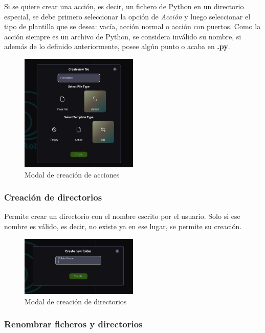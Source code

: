 Si se quiere crear una acción, es decir, un fichero de Python en un directorio especial, se debe primero seleccionar la opción de \textit{Acción} y luego seleccionar el tipo de plantilla que se desea: vacía, acción normal o acción con puertos. Como la acción siempre es un archivo de Python, se considera inválido su nombre, si además de lo definido anteriormente, posee algún punto o acaba en \textbf{.py}.

\begin{figure}[H]
    \centering
    \includegraphics[width=0.5\textwidth]{figures/bt-avances/new-action.png}
    \caption{Modal de creación de acciones}
    \label{fig:bt-action-new}
\end{figure}

\subsubsection{Creación de directorios}

Permite crear un directorio con el nombre escrito por el usuario. Solo si ese nombre es válido, es decir, no existe ya en ese lugar, se permite su creación.

\begin{figure}[H]
    \centering
    \includegraphics[width=0.5\textwidth]{figures/bt-avances/bt-folder-new.png}
    \caption{Modal de creación de directorios}
    \label{fig:bt-dir-new}
\end{figure}

\subsubsection{Renombrar ficheros y directorios}

